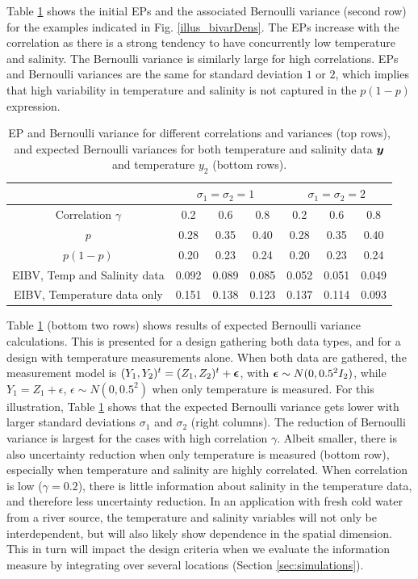 \documentclass[aoas]{imsart}
\begin{document}
Table \ref{tab:sim_rhoab} shows the initial EPs and the associated
Bernoulli variance (second row) for the examples indicated in Fig.
\ref{illus_bivarDens}. The EPs increase with the correlation as there
is a strong tendency to have concurrently low temperature and salinity. The Bernoulli variance is similarly large for high
correlations. EPs and Bernoulli variances are the same for standard
deviation $1$ or $2$, which implies that high variability in
temperature and salinity is not captured in the $p(1-p)$ expression.

\begin{table}[!h] \centering \caption{EP and Bernoulli variance for
    different correlations and variances (top rows), and expected
    Bernoulli variances for both temperature and salinity data ${\boldsymbol y}$ and 
    temperature $y_2$ (bottom rows).}
  \begin{tabular}{c|ccc|ccc}
 &\multicolumn{3}{c}{$\sigma_1=\sigma_2=1$} & \multicolumn{3}{c}{$\sigma_1=\sigma_2=2$} \\
\hline
Correlation $\gamma$ & 0.2 & 0.6 & 0.8 & 0.2 & 0.6 & 0.8 \\
\hline
$p$ & 0.28 & 0.35 & 0.40 & 0.28 & 0.35 & 0.40 \\ 
$p(1-p)$ & 0.20 & 0.23 & 0.24 & 0.20 & 0.23 & 0.24 \\ 
EIBV, Temp and Salinity data & 0.092 & 0.089 & 0.085 & 0.052 & 0.051 & 0.049 \\ 
EIBV, Temperature data only & 0.151 & 0.138 & 0.123 & 0.137 & 0.114 & 0.093 \\ 
\hline
\end{tabular}
\label{tab:sim_rhoab}
\end{table}

Table \ref{tab:sim_rhoab} (bottom two rows) shows results of expected
Bernoulli variance calculations. This is presented for a design
gathering both data types, and for a design with temperature
measurements alone. When both data are gathered, the measurement model is
$(Y_1,Y_2)^t=(Z_1,Z_2)^t+{\boldsymbol \epsilon}$, with ${\boldsymbol \epsilon} \sim N(0,0.5^2I_2)$, while $Y_1=Z_1+\epsilon$, $\epsilon \sim N(0,0.5^2)$ when only temperature is measured.
For this illustration, Table \ref{tab:sim_rhoab} shows that the
expected Bernoulli variance gets lower with larger standard deviations
$\sigma_1$ and $\sigma_2$ (right columns). The reduction of Bernoulli
variance is largest for the cases with high correlation
$\gamma$. Albeit smaller, there is also uncertainty reduction when
only temperature is measured (bottom row), especially when temperature
and salinity are highly correlated. When correlation is low
($\gamma=0.2$), there is little information about salinity in the
temperature data, and therefore less uncertainty reduction. In an
application with fresh cold water from a river source, the temperature
and salinity variables will not only be interdependent, but will also
likely show dependence in the spatial dimension. This in turn will
impact the design criteria when we evaluate the information measure by
integrating over several locations (Section \ref{sec:simulations}).
\end{document}
